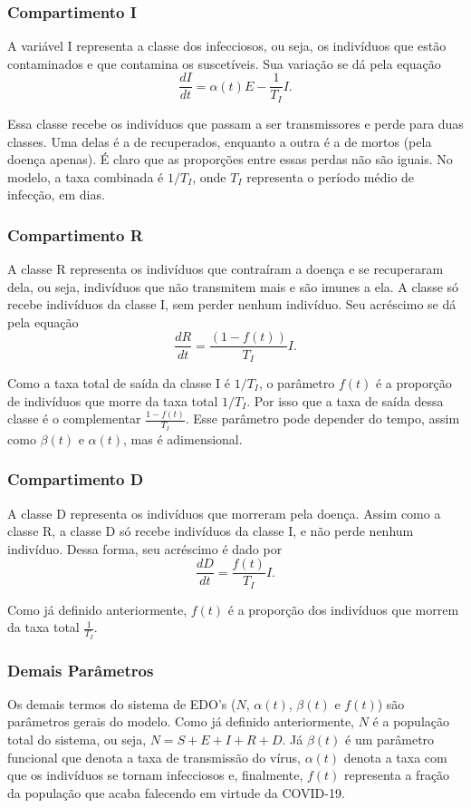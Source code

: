 \documentclass{article}
\begin{document}
\subsubsection{Compartimento I}
A variável I representa a classe dos infecciosos, ou seja, os indivíduos que estão contaminados e que contamina os suscetíveis. Sua variação se dá pela equação
\[\dfrac{dI}{dt} = \alpha(t) E - \dfrac{1}{T_I}I.\]

Essa classe recebe os indivíduos que passam a ser transmissores e perde para duas classes. Uma delas é a de recuperados, enquanto a outra é a de mortos (pela doença apenas). É claro que as proporções entre essas perdas não são iguais. No modelo, a taxa combinada é $1/T_I$, onde $T_I$ representa o período médio de infecção, em dias.

\subsubsection{Compartimento R}
A classe R representa os indivíduos que contraíram a doença e se recuperaram dela, ou seja, indivíduos que não transmitem mais e são imunes a ela. A classe só recebe indivíduos da classe I, sem perder nenhum indivíduo. Seu acréscimo se dá pela equação
\[\dfrac{dR}{dt} = \dfrac{(1 - f(t))}{T_I}I.\]

Como a taxa total de saída da classe I é $1/T_I$, o parâmetro $f(t)$ é a proporção de indivíduos que morre da taxa total $1/T_I$. Por isso que a taxa de saída dessa classe é o complementar $\frac{1 - f(t)}{T_I}$. Esse parâmetro pode depender do tempo, assim como $\beta(t)$ e $\alpha(t)$, mas é adimensional.

\subsubsection{Compartimento D}
A classe D representa os indivíduos que morreram pela doença. Assim como a classe R, a classe D só recebe indivíduos da classe I, e não perde nenhum indivíduo. Dessa forma, seu acréscimo é dado por
\[\dfrac{dD}{dt} = \dfrac{f(t)}{T_I}I.\]

Como já definido anteriormente, $f(t)$ é a proporção dos indivíduos que morrem da taxa total $\frac{1}{T_I}$. 

\subsubsection{Demais Parâmetros}

Os demais termos do sistema de EDO's ($N$, $\alpha(t)$, $\beta(t)$ e $f(t)$) são parâmetros gerais do modelo. Como já definido anteriormente, $N$ é a população total do sistema, ou seja, $N = S + E + I + R + D$. Já $\beta(t)$ é um parâmetro funcional que denota a taxa de transmissão do vírus, $\alpha(t)$ denota a taxa com que os indivíduos se tornam infecciosos e, finalmente, $f(t)$ representa a fração da população que acaba falecendo em virtude da COVID-19.
\end{document}
